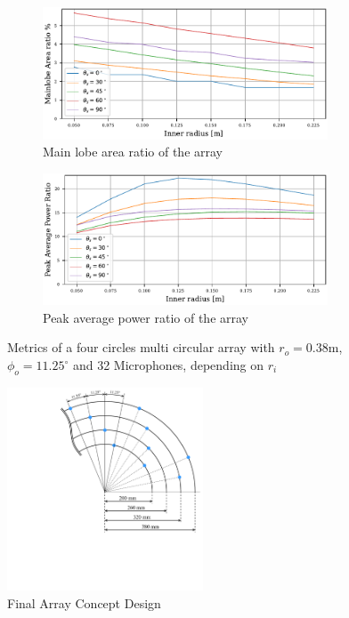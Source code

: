 \newpage
\begin{figure}[h!]
	\centering
	\begin{subfigure}[b]{1\textwidth}
		\centering
		\includegraphics[width=0.93\textwidth, trim={0 0.2cm 0 0.2cm}]{images/5_array_evaluation/final_flat_area.pdf}
		\caption{Main lobe area ratio of the array}
		\label{fig:finar}
	\end{subfigure}
	\begin{subfigure}[b]{1\textwidth}
		\centering
		\includegraphics[width=0.93\textwidth, trim={0 0.2cm 0 0}]{images/5_array_evaluation/final_flat_PAP.pdf}
		\caption{Peak average power ratio of the array}
		\label{fig:finpap}
	\end{subfigure}
	\caption{Metrics of a four circles multi circular array with $r_o=0.38$m,
		$\phi_o = 11.25^\circ$ and 32 Microphones, depending on $r_i$ }
	\label{fig:finflat}
\end{figure}
\begin{figure}[h!]
	\centering
	\vspace{-0.5cm}
	\includegraphics[width=0.52\textwidth, trim={5.5cm 6.1cm 0 0}]{images/5_array_evaluation/final_array_concept_design.pdf}
	\caption{Final Array Concept Design}
	\label{fig:final_array_concept_design}
\end{figure}

